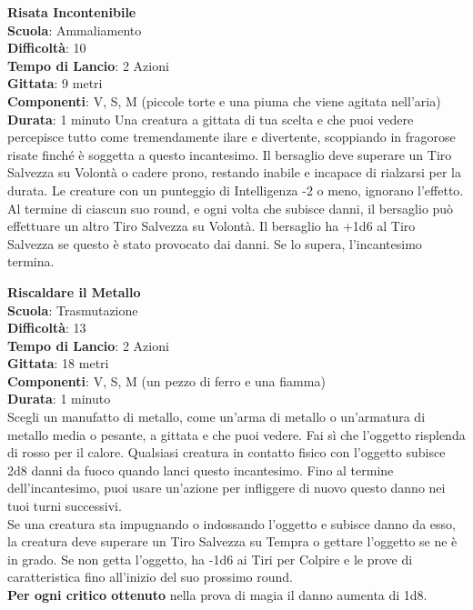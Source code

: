 \begin{multicols}{2}
\medskip\textbf{Risata Incontenibile}\\
\textbf{Scuola}: Ammaliamento\\
\textbf{Difficoltà}:  10\\
\textbf{Tempo di Lancio}: 2 Azioni\\
\textbf{Gittata}: 9 metri\\
\textbf{Componenti}: V, S, M (piccole torte e una piuma che viene agitata nell'aria)\\
\textbf{Durata}: 1 minuto 
Una creatura a gittata di tua scelta e che puoi vedere percepisce tutto come tremendamente ilare e divertente, scoppiando in fragorose risate finché è soggetta a questo incantesimo. Il bersaglio deve superare un Tiro Salvezza su Volontà o cadere prono, restando inabile e incapace di rialzarsi per la durata. Le creature con un punteggio di Intelligenza -2 o meno, ignorano l’effetto.\\
Al termine di ciascun suo round, e ogni volta che subisce danni, il bersaglio può effettuare un altro Tiro Salvezza su Volontà. Il bersaglio ha +1d6 al Tiro Salvezza se questo è stato provocato dai danni. Se lo supera, l'incantesimo termina.

\medskip\textbf{Riscaldare il Metallo}\\
\textbf{Scuola}: Trasmutazione\\
\textbf{Difficoltà}:  13\\
\textbf{Tempo di Lancio}: 2 Azioni\\
\textbf{Gittata}: 18 metri\\
\textbf{Componenti}: V, S, M (un pezzo di ferro e una fiamma)\\
\textbf{Durata}: 1 minuto\\
Scegli un manufatto di metallo, come un'arma di metallo o un'armatura di metallo media o pesante, a gittata e che puoi vedere. Fai sì che l’oggetto risplenda di rosso per il calore. Qualsiasi creatura in contatto fisico con l’oggetto subisce 2d8 danni da fuoco quando lanci questo incantesimo. Fino al termine dell'incantesimo, puoi usare un'azione per infliggere di nuovo questo danno nei tuoi turni successivi.\\
Se una creatura sta impugnando o indossando l’oggetto e subisce danno da esso, la creatura deve superare un Tiro Salvezza su Tempra o gettare l’oggetto se ne è in grado. Se non getta l’oggetto, ha -1d6 ai Tiri per Colpire e le prove di caratteristica fino all'inizio del suo prossimo round.\\
\textbf{Per ogni critico ottenuto} nella prova di magia il danno aumenta di 1d8.


\end{multicols}
